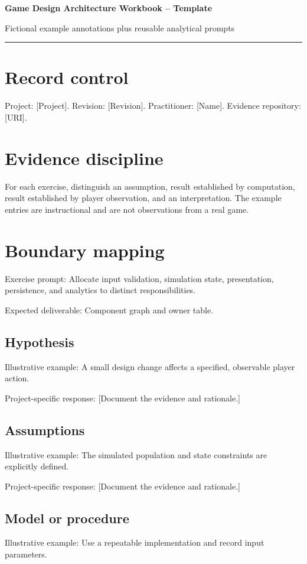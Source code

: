 \documentclass[11pt]{article}
\begin{document}
{\huge\bfseries\color{suiteblue} Game Design Architecture Workbook -- Template}\par
\vspace{0.15in}
{\normalsize\color{suitegray} Fictional example annotations plus reusable analytical prompts}\par
\vspace{0.15in}\hrule\vspace{0.15in}

\section{Record control}
Project: [Project]. Revision: [Revision]. Practitioner: [Name]. Evidence repository: [URI].


\section{Evidence discipline}
For each exercise, distinguish an assumption, result established by computation, result established by player observation, and an interpretation. The example entries are instructional and are not observations from a real game.


\section{Boundary mapping}
Exercise prompt: Allocate input validation, simulation state, presentation, persistence, and analytics to distinct responsibilities.

Expected deliverable: Component graph and owner table.


\subsection{Hypothesis}
Illustrative example: A small design change affects a specified, observable player action.

Project-specific response: [Document the evidence and rationale.]


\subsection{Assumptions}
Illustrative example: The simulated population and state constraints are explicitly defined.

Project-specific response: [Document the evidence and rationale.]


\subsection{Model or procedure}
Illustrative example: Use a repeatable implementation and record input parameters.
\end{document}
